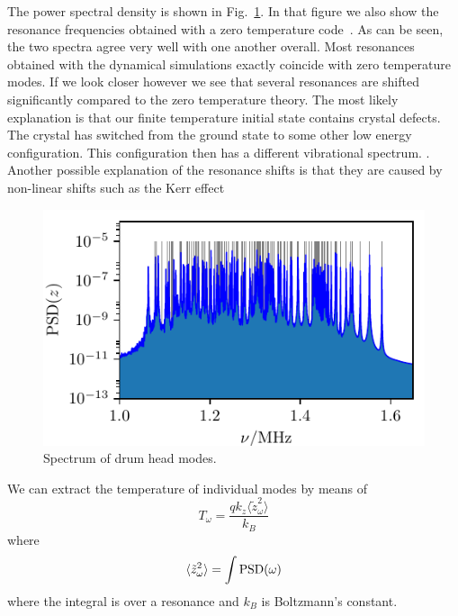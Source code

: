 \documentclass[aps, pra, preprint]{revtex4-1}
\begin{document}
The power spectral density is shown in
Fig.~\ref{fig:axial_spectrum}. In that figure we also show the
resonance frequencies obtained with a zero temperature
code~. As can be seen, the two
spectra agree very well with one another overall. Most resonances
obtained with the dynamical simulations exactly coincide with
zero temperature modes. If we look closer however we see that
several resonances are shifted significantly compared to the zero
temperature theory. The most likely explanation is that our
finite temperature initial state contains crystal defects. The
crystal has switched from the ground state to some other low
energy configuration. This configuration then has a different
vibrational spectrum. . Another possible explanation of the resonance
shifts is that they are caused by non-linear shifts such as the
Kerr effect 

\begin{figure}
  \includegraphics{./figures/fig_axial_spectrum.pdf}
  \caption{Spectrum of drum head modes.}
  \label{fig:axial_spectrum}
\end{figure}

We can extract the temperature of individual modes by means of
\begin{equation}
T_\omega = \frac{qk_z\langle \tilde{z}_\omega^2 \rangle}{k_B}
\end{equation}
where
\begin{equation}
  \langle \tilde{z}_\omega^2 \rangle =
  \int {\rm PSD}(\omega)
\end{equation}
where the integral is over a resonance and $k_B$ is Boltzmann's
constant.
\end{document}
